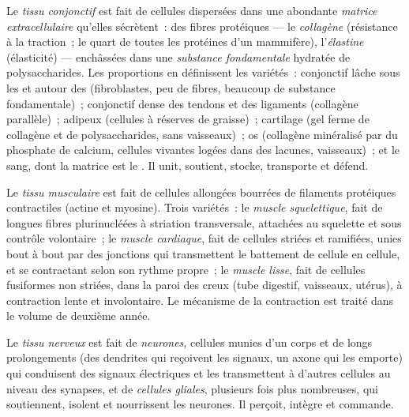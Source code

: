 \begin{definition}\label{def:b1:body-plans-tissues:connective}
Le \emph{tissu conjonctif} est fait de cellules
dispersées dans une abondante \emph{matrice
extracellulaire} qu'elles sécrètent~: des
fibres protéiques --- le \emph{collagène} (résistance à
la traction~; le quart de toutes les protéines d'un mammifère),
l'\emph{élastine} (élasticité) --- enchâssées dans une
\emph{substance fondamentale} hydratée de polysaccharides. Les
proportions en définissent les variétés~:  conjonctif lâche sous
les  et autour des  (fibroblastes, peu de fibres,
beaucoup de substance fondamentale)~;  conjonctif dense des tendons
et des ligaments (collagène parallèle)~;  adipeux (cellules à
réserves de graisse)~; cartilage (gel ferme de collagène et de
polysaccharides, sans vaisseaux)~; os (collagène minéralisé par du
phosphate de calcium, cellules vivantes logées dans des lacunes,
vaisseaux)~; et le sang, dont la matrice est le . Il unit,
soutient, stocke, transporte et défend.
\end{definition}

\begin{definition}\label{def:b1:body-plans-tissues:muscle}
Le \emph{tissu musculaire} est fait de cellules
allongées bourrées de filaments protéiques contractiles (actine et
myosine). Trois variétés~: le \emph{muscle squelettique}, fait de
longues fibres plurinucléées à striation transversale, attachées au
squelette et sous contrôle volontaire~; le \emph{muscle cardiaque}, fait
de cellules striées et ramifiées, unies bout à bout par des jonctions
qui transmettent le battement de cellule en cellule, et se contractant
selon son rythme propre~; le \emph{muscle lisse}, fait de cellules
fusiformes non striées, dans la paroi des  creux (tube digestif,
vaisseaux, utérus), à contraction lente et involontaire. Le mécanisme de
la contraction est traité dans le volume de deuxième année.
\end{definition}

\begin{definition}\label{def:b1:body-plans-tissues:nervous}
Le \emph{tissu nerveux} est fait de
\emph{neurones}, cellules munies d'un corps et de longs
prolongements (des dendrites qui reçoivent les signaux, un axone qui les
emporte) qui conduisent des signaux électriques et les transmettent à
d'autres cellules au niveau des synapses, et de \emph{cellules
gliales}, plusieurs fois plus nombreuses, qui
soutiennent, isolent et nourrissent les neurones. Il perçoit, intègre et
commande.
\end{definition}

